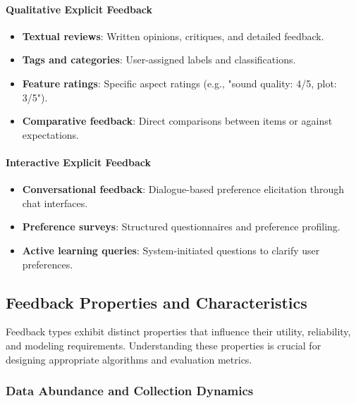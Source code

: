 \documentclass[acmsmall,review,anonymous]{acmart}
\begin{document}
\paragraph{Qualitative Explicit Feedback}
\begin{itemize}
    \item \textbf{Textual reviews}: Written opinions, critiques, and detailed feedback.
    \item \textbf{Tags and categories}: User-assigned labels and classifications.
    \item \textbf{Feature ratings}: Specific aspect ratings (e.g., "sound quality: 4/5, plot: 3/5").
    \item \textbf{Comparative feedback}: Direct comparisons between items or against expectations.
\end{itemize}

\paragraph{Interactive Explicit Feedback}
\begin{itemize}
    \item \textbf{Conversational feedback}: Dialogue-based preference elicitation through chat interfaces.
    \item \textbf{Preference surveys}: Structured questionnaires and preference profiling.
    \item \textbf{Active learning queries}: System-initiated questions to clarify user preferences.
\end{itemize}

\subsection{Feedback Properties and Characteristics}

Feedback types exhibit distinct properties that influence their utility, reliability, and modeling requirements. Understanding these properties is crucial for designing appropriate algorithms and evaluation metrics.

\subsubsection{Data Abundance and Collection Dynamics}
\end{document}
